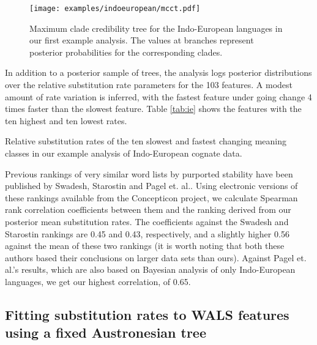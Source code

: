 \documentclass[twocolumn,10pt]{scrartcl}
\begin{document}
\begin{figure}[t]
	\begin{center}
	\texttt{[image: examples/indoeuropean/mcct.pdf]}
	\end{center}
	\caption{Maximum clade credibility tree for the Indo-European languages in our first example analysis.  The values at branches represent posterior probabilities for the corresponding clades.}
\label{fig:ie}
\end{figure}

In addition to a posterior sample of trees, the analysis logs posterior distributions over the relative substitution rate parameters for the 103 features.  A modest amount of rate variation is inferred, with the fastest feature under going change 4 times faster than the slowest feature.  Table \ref{tab:ie} shows the features with the ten highest and ten lowest rates.  
\begin{table}[t]
	\begin{center}
		
	\end{center}
	\caption{Relative substitution rates of the ten slowest and fastest changing meaning classes in our example analysis of Indo-European cognate data.}
\label{tab:ie}
\end{table}

Previous rankings of very similar word lists by purported stability have been published by Swadesh\cite{Swadesh1955}, Starostin\cite{Starostin2007} and Pagel et. al.\cite{Pagel2007}.  Using electronic versions of these rankings available from the Concepticon project\cite{List2015}, we calculate Spearman rank correlation coefficients between them and the ranking derived from our posterior mean substitution rates.  The coefficients against the Swadesh and Starostin rankings are 0.45 and 0.43, respectively, and a slightly higher 0.56 against the mean of these two rankings (it is worth noting that both these authors based their conclusions on larger data sets than ours).  Against Pagel et. al.'s results, which are also based on Bayesian analysis of only Indo-European languages, we get our highest correlation, of 0.65.

\subsection{Fitting substitution rates to WALS features using a fixed Austronesian tree}
\end{document}
